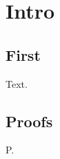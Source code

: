 \documentclass{svmult}
\begin{document}
\chapter{Intro}
\section{First}
Text.
\backmatter
\appendix
\section{Proofs}
P.
\end{document}
